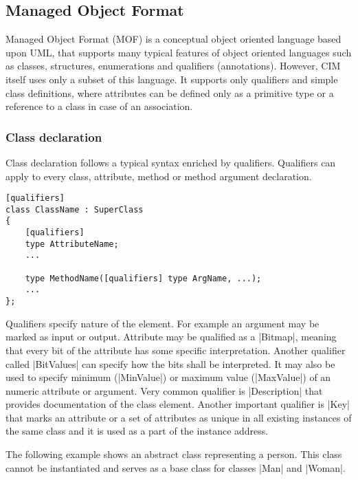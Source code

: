 \subsection{Managed Object Format}
\label{wbem:cim:mof}

Managed Object Format (MOF) is a conceptual object oriented language based upon
UML, that supports many typical features of object oriented languages such as
classes, structures, enumerations and qualifiers (annotations). However, CIM
itself uses only a subset of this language. It supports only qualifiers and
simple class definitions, where attributes can be defined only as a primitive
type or a reference to a class in case of an association.

\subsubsection{Class declaration}
\label{wbem:cim:mof:class}

Class declaration follows a typical syntax enriched by qualifiers. Qualifiers
can apply to every class, attribute, method or method argument declaration.

\begin{lstlisting}[caption={MOF class declaration},
label=lst:wbem:mof:class]
[qualifiers]
class ClassName : SuperClass
{
    [qualifiers]
    type AttributeName;
    ...
    
    type MethodName([qualifiers] type ArgName, ...);
    ...
};
\end{lstlisting}

Qualifiers specify nature of the element. For example an argument may be marked
as input or output. Attribute may be qualified as a |Bitmap|, meaning that every
bit of the attribute has some specific interpretation. Another qualifier called
|BitValues| can specify how the bits shall be interpreted. It may also be used
to specify minimum (|MinValue|) or maximum value (|MaxValue|) of an numeric
attribute or argument. Very common qualifier is |Description| that provides
documentation of the class element. Another important qualifier is |Key| that
marks an attribute or a set of attributes as unique in all existing instances of
the same class and it is used as a part of the instance address.

The following example shows an abstract class representing a person. This class
cannot be instantiated and serves as a base class for classes |Man| and |Woman|.

